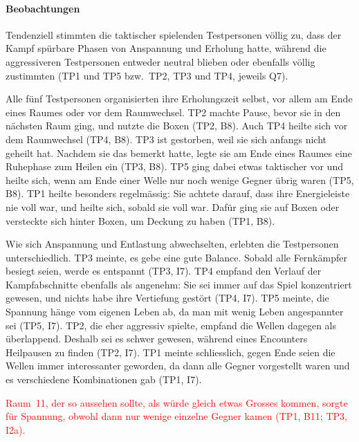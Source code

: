 \documentclass[../Main.tex]{subfiles}
\begin{document}
\paragraph{Beobachtungen}
Tendenziell stimmten die taktischer spielenden Testpersonen völlig zu, dass der Kampf spürbare Phasen von Anspannung und Erholung hatte, während die aggressiveren Testpersonen entweder neutral blieben oder ebenfalls völlig zustimmten (TP1 und TP5 bzw.\ TP2, TP3 und TP4, jeweils Q7).

Alle fünf Testpersonen organisierten ihre Erholungszeit selbst, vor allem am Ende eines Raumes oder vor dem Raumwechsel. TP2 machte Pause, bevor sie in den nächsten Raum ging, und nutzte die Boxen (TP2, B8). Auch TP4 heilte sich vor dem Raumwechsel (TP4, B8). TP3 ist gestorben, weil sie sich anfangs nicht geheilt hat. Nachdem sie das bemerkt hatte, legte sie am Ende eines Raumes eine Ruhephase zum Heilen ein (TP3, B8). TP5 ging dabei etwas taktischer vor und heilte sich, wenn am Ende einer Welle nur noch wenige Gegner übrig waren (TP5, B8). TP1 heilte besonders regelmässig: Sie achtete darauf, dass ihre Energieleiste nie voll war, und heilte sich, sobald sie voll war. Dafür ging sie auf Boxen oder versteckte sich hinter Boxen, um Deckung zu haben (TP1, B8).

Wie sich Anspannung und Entlastung abwechselten, erlebten die Testpersonen unterschiedlich. TP3 meinte, es gebe eine gute Balance. Sobald alle Fernkämpfer besiegt seien, werde es entspannt (TP3, I7). TP4 empfand den Verlauf der Kampfabschnitte ebenfalls als angenehm: Sie sei immer auf das Spiel konzentriert gewesen, und nichts habe ihre Vertiefung gestört (TP4, I7). TP5 meinte, die Spannung hänge vom eigenen Leben ab, da man mit wenig Leben angespannter sei (TP5, I7). TP2, die eher aggressiv spielte, empfand die Wellen dagegen als überlappend. Deshalb sei es schwer gewesen, während eines Encounters Heilpausen zu finden (TP2, I7). TP1 meinte schliesslich, gegen Ende seien die Wellen immer interessanter geworden, da dann alle Gegner vorgestellt waren und es verschiedene Kombinationen gab (TP1, I7).

\textcolor{red}{Raum~11, der so aussehen sollte, als würde gleich etwas Grosses kommen, sorgte für Spannung, obwohl dann nur wenige einzelne Gegner kamen (TP1, B11; TP3, I2a).}
\end{document}
